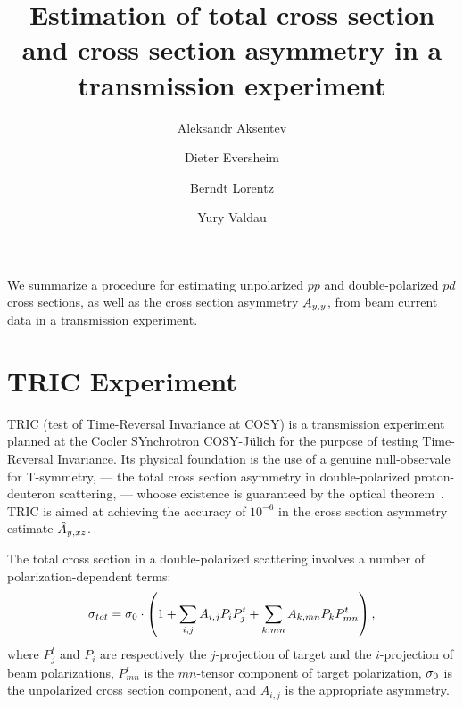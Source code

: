 \documentclass[reprint, superscriptaddress]{revtex4-1}
\begin{document}
\title{Estimation of total cross section and cross section asymmetry in a transmission experiment}
\author{Aleksandr Aksentev}
\author{Dieter Eversheim}
\author{Berndt Lorentz}
\author{Yury Valdau}

\maketitle
	
	
\begin{abstractname}
We summarize a procedure for estimating unpolarized $pp$ and double-polarized $pd$ cross sections, as well as the cross section asymmetry $\Ayy$, from beam current data in a transmission experiment.
\end{abstractname}

\section{TRIC Experiment}

TRIC (test of Time-Reversal Invariance at COSY) is a transmission experiment planned at the Cooler SYnchrotron COSY-J\"ulich for the purpose of testing Time-Reversal Invariance. Its physical foundation is the use of a genuine null-observale for T-symmetry, --- the total cross section asymmetry in double-polarized proton-deuteron scattering, --- whoose existence is guaranteed by the optical theorem~\cite{Conzett}. TRIC is aimed at achieving the accuracy of $10^{-6}$ in the cross section asymmetry estimate $\Ayxz*$.

The total cross section in a double-polarized scattering involves a number of polarization-dependent terms:
\begin{equation}\label{eq:PolCS}
	\CS[tot] = \CS[0]\cdot\bkt{1 + \sum_{i,j} A_{i,j} P_iP^t_j + \sum_{k, mn} A_{k,mn}P_k P^t_{mn}},
\end{equation}
where $P^t_j$ and $P_i$ are respectively the $j$-projection of target and the $i$-projection of beam polarizations, $P^t_{mn}$ is the $mn$-tensor component of target polarization, $\CS[0]$ is the unpolarized cross section component, and $A_{i,j}$ is the appropriate asymmetry.
\end{document}
